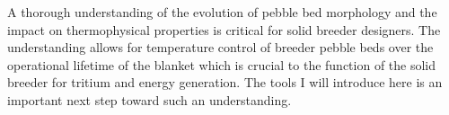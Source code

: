 A thorough understanding of the evolution of pebble bed morphology and the impact on thermophysical properties is critical for solid breeder designers. The understanding allows for temperature control of breeder pebble beds over the operational lifetime of the blanket which is crucial to the function of the solid breeder for tritium and energy generation. The tools I will introduce here is an important next step toward such an understanding. 


